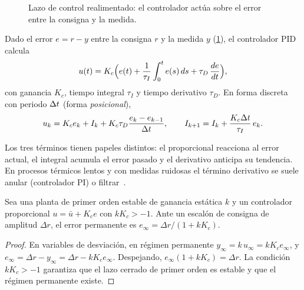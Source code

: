 \begin{figure}[h]
\centering
{}
\caption{Lazo de control realimentado: el controlador actúa sobre el error entre la consigna y la medida.}
\label{fig:lazo}
\end{figure}

\begin{definicion}\label{def:pid}
Dado el error $e=r-y$ entre la consigna $r$ y la medida $y$ (\cref{fig:lazo}), el controlador PID calcula
\[
u(t)=K_c\Bigl(e(t)+\frac{1}{\tau_I}\int_0^{t}e(s)\,ds+\tau_D\,\frac{de}{dt}\Bigr),
\]
con ganancia $K_c$, tiempo integral $\tau_I$ y tiempo derivativo $\tau_D$. En forma discreta con periodo $\Delta t$ (forma \emph{posicional}),
\[
u_k=K_ce_k+I_k+K_c\tau_D\frac{e_k-e_{k-1}}{\Delta t},\qquad I_{k+1}=I_k+\frac{K_c\Delta t}{\tau_I}\,e_k .
\]
\end{definicion}

Los tres términos tienen papeles distintos: el proporcional reacciona al error actual, el integral acumula el error pasado y el derivativo anticipa su tendencia. En procesos térmicos lentos y con medidas ruidosas el término derivativo se suele anular (controlador PI) o filtrar~\cite[cap.~11]{am}.

\begin{proposicion}\label{prop:offset}
Sea una planta de primer orden estable de ganancia estática $k$ y un controlador proporcional $u=\bar u+K_ce$ con $kK_c>-1$. Ante un escalón de consigna de amplitud $\Delta r$, el error permanente es $e_\infty=\Delta r/(1+kK_c)$.
\end{proposicion}

\begin{proof}
En variables de desviación, en régimen permanente $y_\infty=k\,u_\infty=kK_ce_\infty$, y $e_\infty=\Delta r-y_\infty=\Delta r-kK_ce_\infty$. Despejando, $e_\infty(1+kK_c)=\Delta r$. La condición $kK_c>-1$ garantiza que el lazo cerrado de primer orden es estable y que el régimen permanente existe.
\end{proof}

